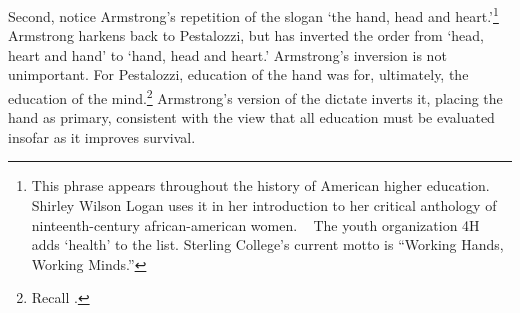 Second, notice Armstrong's repetition of the slogan `the hand, head and heart.'\footnote{This phrase appears throughout the history of American higher education. Shirley Wilson Logan uses it in her introduction to her critical anthology of ninteenth-century african-american women. ~\citep{Logan:1995ua} The youth organization 4H adds `health' to the list. Sterling College's current motto is ``Working Hands, Working Minds.''} Armstrong harkens back to Pestalozzi, but has inverted the order from `head, heart and hand' to `hand, head and heart.' Armstrong's inversion is not unimportant. For Pestalozzi, education of the hand was for, ultimately, the education of the mind.\footnote{Recall .} Armstrong's version of the dictate inverts it, placing the hand as primary, consistent with the view that all education must be evaluated insofar as it improves survival.

